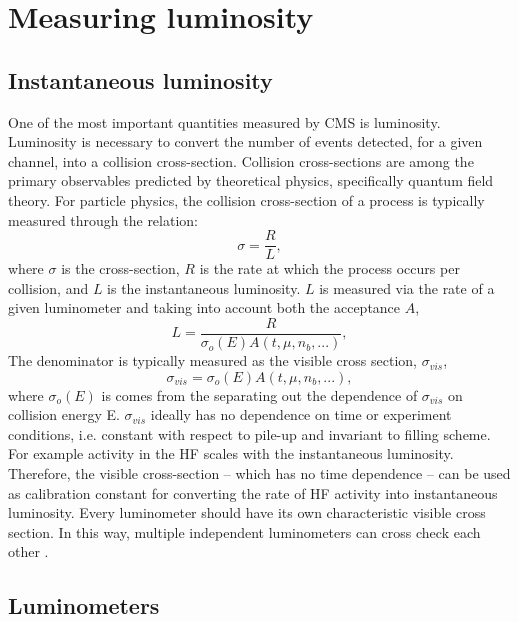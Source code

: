 \setlength\abovedisplayskip{0.4pt}
\setlength\belowdisplayskip{0.4pt}

\chapter{Measuring luminosity}

\section{Instantaneous luminosity}

One of the most important quantities measured by CMS is luminosity. Luminosity is necessary to convert the number of events detected, for a given channel, into a collision cross-section. Collision cross-sections are among the primary observables predicted by theoretical physics, specifically quantum field theory. For particle physics, the collision cross-section of a process is typically measured through the relation:
\begin{equation}
\sigma  = \frac{R}{\mathit{L}} ,
\end{equation}
where $\sigma$ is the cross-section, $R$ is the rate at which the process occurs per collision, and $L$ is the instantaneous luminosity. $L$ is measured via the rate of a given luminometer and taking into account both the acceptance $A$,
\begin{equation}
L  = \frac{R}{ \sigma_{o}(E) A(t,\mu,n_b,...)} ,
\end{equation}
The denominator is typically measured as the visible cross section, $\sigma_{vis}$,
\begin{equation}
\sigma_{vis}  = \sigma_{o}(E) A(t,\mu,n_b,...),
\end{equation}
where $\sigma_{o}(E)$ is comes from the separating out the dependence of $\sigma_{vis}$ on collision energy E. $\sigma_{vis}$ ideally has no dependence on time or experiment conditions, i.e. constant with respect to pile-up and invariant to filling scheme. For example activity in the HF scales with the instantaneous luminosity. Therefore, the visible cross-section -- which has no time dependence -- can be used as calibration constant for converting the rate of HF activity into instantaneous luminosity. Every luminometer should have its own characteristic visible cross section. In this way, multiple independent luminometers can cross check each other \cite{CMS:2013gfa} \cite{cmsLumi}\cite{Krasny:2006xg}.

\section{Luminometers}

